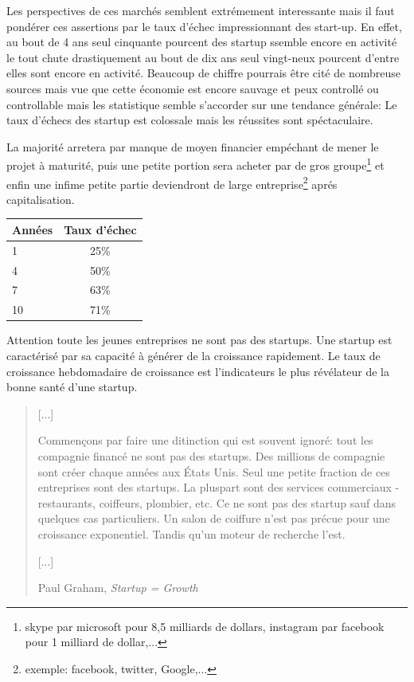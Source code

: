 \documentclass[11pt, a4paper ]{article}
\begin{document}
Les perspectives de ces marchés semblent extrémement interessante mais il faut pondérer ces assertions par le taux d'échec impressionnant des start-up. En effet, au bout de 4 ans seul cinquante pourcent des startup ssemble encore en activité le tout chute drastiquement au bout de dix ans seul vingt-neux pourcent d'entre elles sont encore en activité.
Beaucoup de chiffre pourrais être cité de nombreuse sources mais vue que cette économie est encore sauvage et peux controllé ou controllable mais les statistique semble s'accorder sur une tendance générale: Le taux d'échecs des startup est colossale mais les réussites sont spéctaculaire.

La majorité  arretera par manque de moyen financier empéchant de mener le projet à maturité,  puis une petite portion sera acheter par de gros groupe\footnote{ skype par microsoft pour 8,5 milliards de dollars, instagram par facebook pour 1 milliard de dollar,... } et enfin une infime petite partie deviendront de large entreprise\footnote{exemple: facebook, twitter, Google,...} aprés capitalisation.

\begin{center}
	\begin{tabular}{l*{1}{c}}
		Années  & Taux d'échec\\
		\hline
		1 & 25\% \\
		4 & 50\% \\
		7 & 63\% \\
		10 & 71\% \\
	\end{tabular}\cite{statEchecStartup}
\end{center}

Attention toute les jeunes entreprises ne sont pas des startups. Une startup est caractérisé par sa capacité à générer de la croissance rapidement. Le taux de croissance hebdomadaire de croissance est l'indicateurs le plus révélateur de la bonne santé d'une startup.

\begin{quote}
	[...]

	Commençons par faire une ditinction qui est souvent ignoré: tout les compagnie financé ne sont pas des startups. Des millions de compagnie sont créer chaque années aux États Unis. Seul une petite fraction de ces entreprises sont des startups. La pluspart sont des services commerciaux - restaurants, coiffeurs, plombier, etc. Ce ne sont pas des startup sauf dans quelques cas particuliers. Un salon de coiffure n'est pas précue pour une croissance exponentiel. Tandis qu'un moteur de recherche l'est.

	[...]


	\caption{Paul Graham, \emph{Startup = Growth\cite{startupGrowth}}}
\end{quote}
\end{document}

